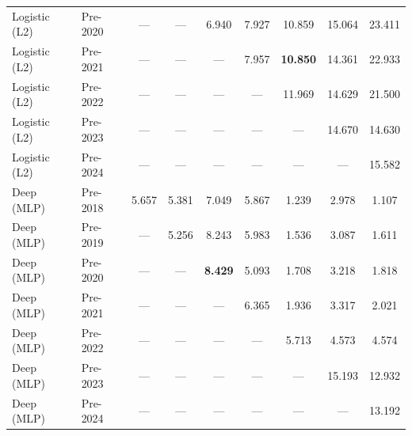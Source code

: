 \begin{table}[htbp]
{\begin{tabular}{l lccccccc}
Logistic (L2) & Pre-2020 & --- & --- & 6.940 & 7.927 & 10.859 & 15.064 & 23.411 \\
Logistic (L2) & Pre-2021 & --- & --- & --- & 7.957 & \textbf{10.850} & 14.361 & 22.933 \\
Logistic (L2) & Pre-2022 & --- & --- & --- & --- & 11.969 & 14.629 & 21.500 \\
Logistic (L2) & Pre-2023 & --- & --- & --- & --- & --- & 14.670 & 14.630 \\
Logistic (L2) & Pre-2024 & --- & --- & --- & --- & --- & --- & 15.582 \\
Deep (MLP) & Pre-2018 & 5.657 & 5.381 & 7.049 & 5.867 & 1.239 & 2.978 & 1.107 \\
Deep (MLP) & Pre-2019 & --- & 5.256 & 8.243 & 5.983 & 1.536 & 3.087 & 1.611 \\
Deep (MLP) & Pre-2020 & --- & --- & \textbf{8.429} & 5.093 & 1.708 & 3.218 & 1.818 \\
Deep (MLP) & Pre-2021 & --- & --- & --- & 6.365 & 1.936 & 3.317 & 2.021 \\
Deep (MLP) & Pre-2022 & --- & --- & --- & --- & 5.713 & 4.573 & 4.574 \\
Deep (MLP) & Pre-2023 & --- & --- & --- & --- & --- & 15.193 & 12.932 \\
Deep (MLP) & Pre-2024 & --- & --- & --- & --- & --- & --- & 13.192 \\
\bottomrule
\end{tabular}%
}
\end{table}